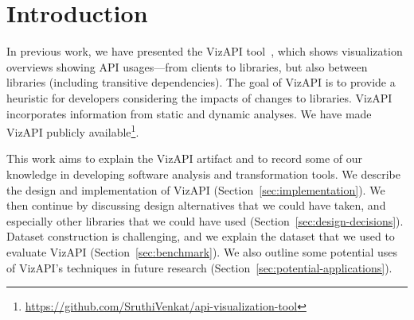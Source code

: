 \section{Introduction}
\label{sec:introduction}

In previous work, we have presented the VizAPI tool~\cite{venkatanarayananvizapi,venkatanarayanan22:_study_lever_api_usage_patter}, which shows visualization overviews showing API usages---from clients to libraries, but also between libraries (including transitive dependencies). The goal of VizAPI is to provide a heuristic for developers considering the impacts of changes to libraries. VizAPI incorporates information from static and dynamic analyses. We have made VizAPI publicly available\footnote{\url{https://github.com/SruthiVenkat/api-visualization-tool}}.

This work aims to explain the VizAPI artifact and to record some of our knowledge in developing software analysis and transformation tools. We describe the design and implementation of VizAPI (Section~\ref{sec:implementation}). We then continue by discussing design alternatives that we could have taken, and especially other libraries that we could have used (Section~\ref{sec:design-decisions}). Dataset construction is challenging, and we explain the dataset that we used to evaluate VizAPI (Section~\ref{sec:benchmark}). We also outline some potential uses of VizAPI's techniques in future research (Section~\ref{sec:potential-applications}).



